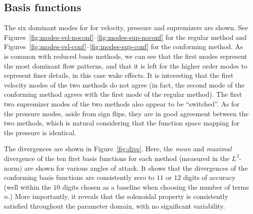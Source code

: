 \documentclass[onecolumn, twoside, a4paper, 11pt]{article}
\begin{document}
\subsection{Basis functions}

The six dominant modes for for velocity, pressure and supremizers are shown. See
Figures~\ref{fig:modes-vel-noconf}--\ref{fig:modes-sup-noconf} for the regular
method and Figures~\ref{fig:modes-vel-conf}--\ref{fig:modes-sup-conf} for the
conforming method. As is common with reduced basis methods, we can see that the
first modes represent the most dominant flow patterns, and that it is left for
the higher order modes to represent finer details, in this case wake effects. It
is interesting that the first velocity modes of the two methods do not agree
(in fact, the second mode of the conforming method agrees with the first mode of
the regular method). The first two supremizer modes of the two methods also
appear to be ``switched''. As for the pressure modes, aside from sign flips,
they are in good agreement between the two methods, which is natural considering
that the function space mapping for the pressure is identical.

The divergences are shown in Figure~\ref{fig:divs}. Here, the \emph{mean} and
\emph{maximal} divergence of the ten first basis functions for each method
(measured in the $L^2$-norm) are shown for various angles of attack. It shows
that the divergences of the conforming basis functions are consistently zero to
$11$ or $12$ digits of accuracy (well within the $10$ digits chosen as a
baseline when choosing the number of terms $n$.) More importantly, it reveals
that the solenoidal property is consistently satisfied throughout the parameter
domain, with no significant variability.
\end{document}
